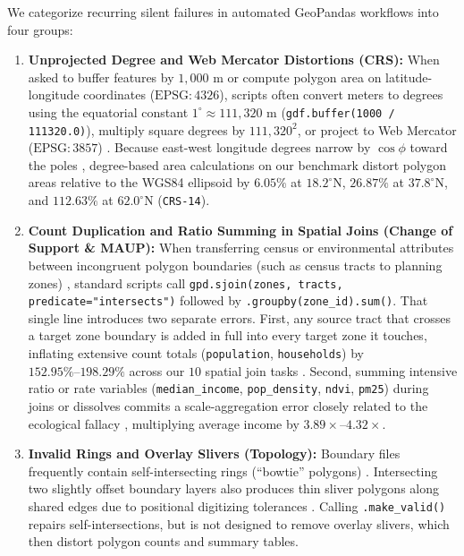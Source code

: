 \documentclass[10pt,twocolumn]{article}
\begin{document}
We categorize recurring silent failures in automated GeoPandas workflows into four groups:
\begin{enumerate}
  \item \textbf{Unprojected Degree and Web Mercator Distortions (CRS):} When asked to buffer features by $1,000\text{ m}$ or compute polygon area on latitude-longitude coordinates ($\text{EPSG}:4326$), scripts often convert meters to degrees using the equatorial constant $1^\circ \approx 111,320\text{ m}$ (\texttt{gdf.buffer\allowbreak(1000 / 111320.0)}), multiply square degrees by $111,320^2$, or project to Web Mercator ($\text{EPSG}:3857$) \cite{battersby2014implications}. Because east-west longitude degrees narrow by $\cos\phi$ toward the poles \cite{snyder1987map,karney2013algorithms}, degree-based area calculations on our benchmark distort polygon areas relative to the WGS84 ellipsoid by $6.05\%$ at $18.2^\circ\text{N}$, $26.87\%$ at $37.8^\circ\text{N}$, and $112.63\%$ at $62.0^\circ\text{N}$ (\texttt{CRS-14}).
  \item \textbf{Count Duplication and Ratio Summing in Spatial Joins (Change of Support \& MAUP):} When transferring census or environmental attributes between incongruent polygon boundaries (such as census tracts to planning zones) \cite{openshaw1984maup,fotheringham1991maup,gotway2002combining}, standard scripts call \texttt{gpd.sjoin\allowbreak(zones, tracts, predicate="intersects")} followed by \texttt{.groupby(zone\_id).sum()}. That single line introduces two separate errors. First, any source tract that crosses a target zone boundary is added in full into every target zone it touches, inflating extensive count totals (\texttt{population}, \texttt{households}) by $152.95\%\text{--}198.29\%$ across our $10$ spatial join tasks \cite{goodchild1980areal,tobler1979smooth}. Second, summing intensive ratio or rate variables (\texttt{median\_income}, \texttt{pop\_density}, \texttt{ndvi}, \texttt{pm25}) during joins or dissolves commits a scale-aggregation error closely related to the ecological fallacy \cite{robinson1950ecological,kuhn2012core,scheider2017semantic}, multiplying average income by $3.89\times\text{--}4.32\times$.
  \item \textbf{Invalid Rings and Overlay Slivers (Topology):} Boundary files frequently contain self-intersecting rings (``bowtie'' polygons) \cite{egenhofer1991pointset,ledoux2014triangulation}. Intersecting two slightly offset boundary layers also produces thin sliver polygons along shared edges due to positional digitizing tolerances \cite{goodchild1997simple}. Calling \texttt{.make\_valid()} repairs self-intersections, but is not designed to remove overlay slivers, which then distort polygon counts and summary tables.

\end{enumerate}
\end{document}
